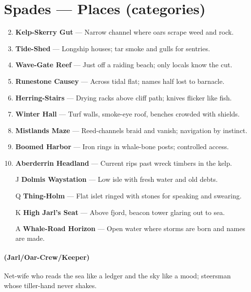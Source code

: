 \section*{Spades --- Places (categories)}
\label{sec:linn-places}
\begin{enumerate}
\setcounter{enumi}{1}
\item \textbf{Kelp-Skerry Gut} --- Narrow channel where oars scrape weed and rock.
\item \textbf{Tide-Shed} --- Longship houses; tar smoke and gulls for sentries.
\item \textbf{Wave-Gate Reef} --- Just off a raiding beach; only locals know the cut.
\item \textbf{Runestone Causey} --- Across tidal flat; names half lost to barnacle.
\item \textbf{Herring-Stairs} --- Drying racks above cliff path; knives flicker like fish.
\item \textbf{Winter Hall} --- Turf walls, smoke-eye roof, benches crowded with shields.
\item \textbf{Mistlands Maze} --- Reed-channels braid and vanish; navigation by instinct.
\item \textbf{Boomed Harbor} --- Iron rings in whale-bone posts; controlled access.
\item \textbf{Aberderrin Headland} --- Current rips past wreck timbers in the kelp.
\item[J] \textbf{Dolmis Waystation} --- Low isle with fresh water and old debts.
\item[Q] \textbf{Thing-Holm} --- Flat islet ringed with stones for speaking and swearing.
\item[K] \textbf{High Jarl's Seat} --- Above fjord, beacon tower glaring out to sea.
\item[A] \textbf{Whale-Road Horizon} --- Open water where storms are born and names are made.
\end{enumerate}

\paragraph*{(Jarl/Oar-Crew/Keeper)} Net-wife who reads the sea like a ledger and the sky like a mood; steersman whose tiller-hand never shakes.

